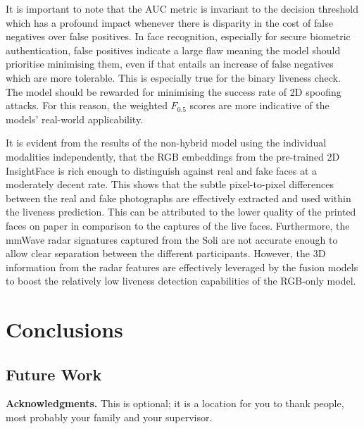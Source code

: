 \documentclass{mpaper}
\begin{document}
It is important to note that the AUC metric is invariant to the decision threshold which has a profound impact whenever there is disparity in the cost of false negatives over false positives. In face recognition, especially for secure biometric authentication, false positives indicate a large flaw meaning the model should prioritise minimising them, even if that entails an increase of false negatives which are more tolerable. This is especially true for the binary liveness check. The model should be rewarded for minimising the success rate of 2D spoofing attacks. For this reason, the weighted $F_{0.5}$ scores are more indicative of the models' real-world applicability. 

It is evident from the results of the non-hybrid model using the individual modalities independently, that the RGB embeddings from the pre-trained 2D InsightFace is rich enough to distinguish against real and fake faces at a moderately decent rate. This shows that the subtle pixel-to-pixel differences between the real and fake photographs are effectively extracted and used within the liveness prediction. This can be attributed to the lower quality of the printed faces on paper in comparison to the captures of the live faces. Furthermore, the mmWave radar signatures captured from the Soli are not accurate enough to allow clear separation between the different participants. However, the 3D information from the radar features are effectively leveraged by the fusion models to boost the relatively low liveness detection capabilities of the RGB-only model.

\section{Conclusions}



\subsection{Future Work}


{\bf Acknowledgments.}
This is optional; it is a location for you to thank people, most probably your family and your supervisor.




\end{document}

